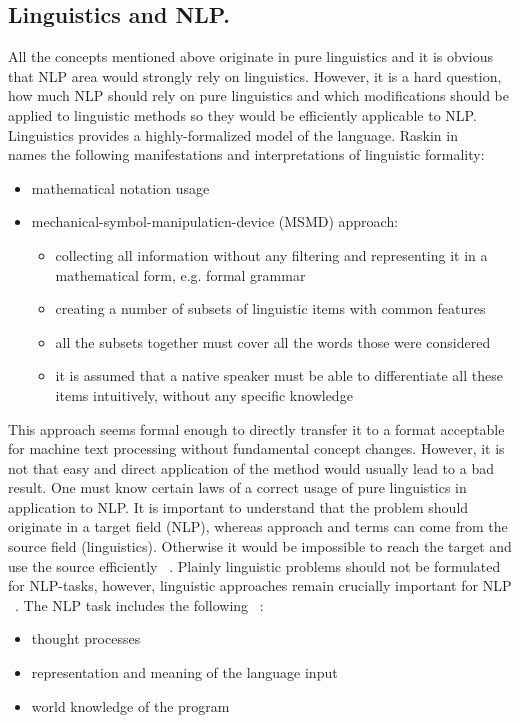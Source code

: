 \documentclass[11pt]{report}
\numberwithin{equation}{section} %
\begin{document}
\subsection{Linguistics and NLP.}


All the concepts mentioned above originate in pure linguistics and it is obvious that NLP area would strongly rely on linguistics. However, it is a hard question, how much NLP should rely on pure linguistics and which modifications should be applied to linguistic methods so they would be efficiently applicable to NLP. Linguistics provides a highly-formalized model of the language. Raskin in ~\cite{Raskin} names the following manifestations and interpretations of linguistic formality:

\begin{itemize}
\item mathematical notation usage
\item mechanical-symbol-manipulaticn-device (MSMD) approach:
\begin{itemize}
\item collecting all information without any filtering and representing it in a mathematical form, e.g. formal grammar
\item creating a number of subsets of linguistic items with common features
\item all the subsets together must cover all the words those were considered
\item it is assumed that a native speaker must be able to differentiate all these items intuitively, without any specific knowledge
\end{itemize}
\end{itemize}

This approach seems formal enough to directly transfer it to a format acceptable for machine text processing without fundamental concept changes. However, it is not that easy and direct application of the method would usually lead to a bad result. One must know certain laws of a correct usage of pure linguistics in application to NLP. It is important to understand that the problem should originate in a target field (NLP), whereas approach and terms can come from the source field (linguistics). Otherwise it would be impossible to reach the target and use the source efficiently ~\cite{Raskin}. Plainly linguistic problems should not be formulated for NLP-tasks, however, linguistic approaches remain crucially important for NLP ~\cite{Steedman}. The NLP task includes the following ~\cite{Chowdhury}: 
\begin{itemize}
\item thought processes
\item representation and meaning of the language input
\item world knowledge of the program
\end{itemize}
\end{document}
